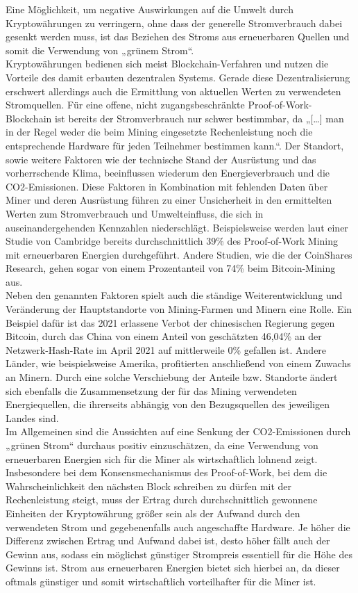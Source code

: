 Eine Möglichkeit, um negative Auswirkungen auf die Umwelt durch Kryptowährungen zu verringern, ohne dass der generelle Stromverbrauch dabei gesenkt werden muss, ist das Beziehen des Stroms aus erneuerbaren Quellen und somit die Verwendung von „grünem Strom“.\\
Kryptowährungen bedienen sich meist Blockchain-Verfahren und nutzen die Vorteile des damit erbauten dezentralen Systems. Gerade diese Dezentralisierung erschwert allerdings auch die Ermittlung von aktuellen Werten zu verwendeten Stromquellen. Für eine offene, nicht zugangsbeschränkte Proof-of-Work-Blockchain ist bereits der Stromverbrauch nur schwer bestimmbar, da „[…] man in der Regel weder die beim Mining eingesetzte Rechenleistung noch die entsprechende Hardware für jeden Teilnehmer bestimmen kann.“. Der Standort, sowie weitere Faktoren wie der technische Stand der Ausrüstung und das vorherrschende Klima, beeinflussen wiederum den Energieverbrauch und die CO2-Emissionen. Diese Faktoren in Kombination mit fehlenden Daten über Miner und deren Ausrüstung führen zu einer Unsicherheit in den ermittelten Werten zum Stromverbrauch und Umwelteinfluss, die sich in auseinandergehenden Kennzahlen niederschlägt. Beispielsweise werden laut einer Studie von Cambridge bereits durchschnittlich 39\% des Proof-of-Work Mining mit erneuerbaren Energien durchgeführt. Andere Studien, wie die der CoinShares Research, gehen sogar von einem Prozentanteil von 74\% beim Bitcoin-Mining aus.\\
Neben den genannten Faktoren spielt auch die ständige Weiterentwicklung und Veränderung der Hauptstandorte von Mining-Farmen und Minern eine Rolle. Ein Beispiel dafür ist das 2021 erlassene Verbot der chinesischen Regierung gegen Bitcoin, durch das China von einem Anteil von geschätzten 46,04\% an der Netzwerk-Hash-Rate im April 2021 auf mittlerweile 0\% gefallen ist. Andere Länder, wie beispielsweise Amerika, profitierten anschließend von einem Zuwachs an Minern. Durch eine solche Verschiebung der Anteile bzw. Standorte ändert sich ebenfalls die Zusammensetzung der für das Mining verwendeten Energiequellen, die ihrerseits abhängig von den Bezugsquellen des jeweiligen Landes sind.\\
Im Allgemeinen sind die Aussichten auf eine Senkung der CO2-Emissionen durch „grünen Strom“ durchaus positiv einzuschätzen, da eine Verwendung von erneuerbaren Energien sich für die Miner als wirtschaftlich lohnend zeigt. Insbesondere bei dem Konsensmechanismus des Proof-of-Work, bei dem die Wahrscheinlichkeit den nächsten Block schreiben zu dürfen mit der Rechenleistung steigt, muss der Ertrag durch durchschnittlich gewonnene Einheiten der Kryptowährung größer sein als der Aufwand durch den verwendeten Strom und gegebenenfalls auch angeschaffte Hardware. Je höher die Differenz zwischen Ertrag und Aufwand dabei ist, desto höher fällt auch der Gewinn aus, sodass ein möglichst günstiger Strompreis essentiell für die Höhe des Gewinns ist. Strom aus erneuerbaren Energien bietet sich hierbei an, da dieser oftmals günstiger und somit wirtschaftlich vorteilhafter für die Miner ist.\\
